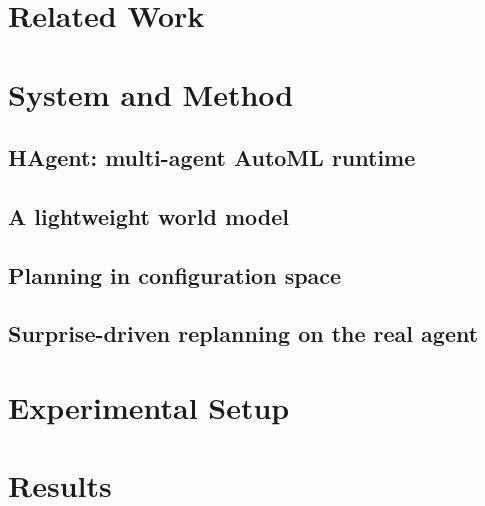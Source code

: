 \documentclass[11pt,a4paper]{article}
\begin{document}
\section{Related Work}

\section{System and Method}
\subsection{HAgent: multi-agent AutoML runtime}
\subsection{A lightweight world model}
\subsection{Planning in configuration space}
\subsection{Surprise-driven replanning on the real agent}

\section{Experimental Setup}

\section{Results}
% 
% 
\end{document}
